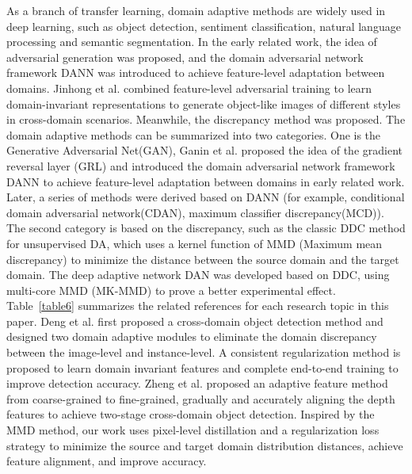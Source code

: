 \documentclass[sn-mathphys]{sn-jnl}%
\theoremstyle{thmstyleone}%
\theoremstyle{thmstyletwo}%
\theoremstyle{thmstylethree}%
\begin{document}
As a branch of transfer learning, domain adaptive methods are widely used in deep learning, such as object detection\cite{chen2018domain,liu2021unbiased,he2020domain,saito2019strong}, sentiment classification\cite{sadr2022acnn,thakkar2022improving}, natural language processing\cite{gururangan2020don} and semantic segmentation\cite{chen2022unsupervised,tasar2020colormapgan}.
In the early related work, the idea of adversarial generation was proposed, and the domain adversarial network framework DANN was introduced to achieve feature-level adaptation between domains. Jinhong et al.\cite{deng2021unbiased} combined feature-level adversarial training to learn domain-invariant representations to generate object-like images of different styles in cross-domain scenarios. Meanwhile, the discrepancy method was proposed. The domain adaptive methods can be summarized into two categories. One is the Generative Adversarial Net(GAN), Ganin et al.\cite{ganin2015unsupervised} proposed the idea of the gradient reversal layer (GRL) and introduced the domain adversarial network framework DANN to achieve feature-level adaptation between domains in early related work. Later, a series of methods were derived based on DANN (for example, conditional domain adversarial network(CDAN)\cite{long2017conditional}, maximum classifier discrepancy(MCD)\cite{tzeng2014deep}). The second category is based on the discrepancy, such as the classic DDC\cite{saito2018maximum} method for unsupervised DA, which uses a kernel function of MMD (Maximum mean discrepancy) to minimize the distance between the source domain and the target domain. The deep adaptive network DAN was developed based on DDC, using multi-core MMD (MK-MMD) to prove a better experimental effect. Table~\ref{table6} summarizes the related references for each research topic in this paper. Deng et al.\cite{deng2021unbiased} first proposed a cross-domain object detection method and designed two domain adaptive modules to eliminate the domain discrepancy between the image-level and instance-level. A consistent regularization method is proposed to learn domain invariant features and complete end-to-end training to improve detection accuracy. Zheng et al.\cite{zheng2020cross} proposed an adaptive feature method from coarse-grained to fine-grained, gradually and accurately aligning the depth features to achieve two-stage cross-domain object detection. Inspired by the MMD method, our work uses pixel-level distillation and a regularization loss strategy to minimize the source and target domain distribution distances, achieve feature alignment, and improve accuracy.
 
\end{document}
